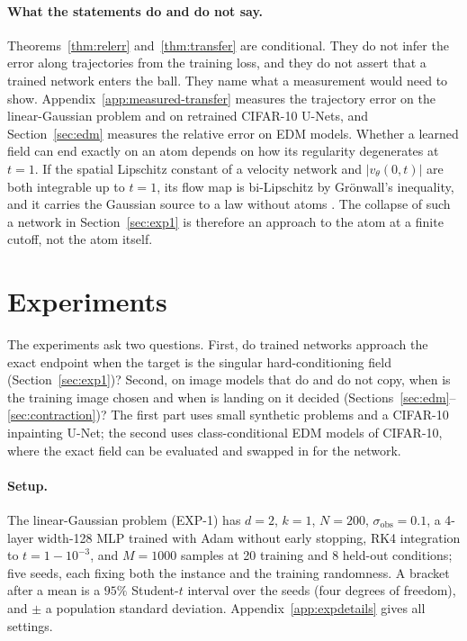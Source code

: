 \documentclass{article} %
\theoremstyle{plain}
\theoremstyle{definition}
\theoremstyle{remark}
\begin{document}
\paragraph{What the statements do and do not say.} Theorems~\ref{thm:relerr}
and~\ref{thm:transfer} are conditional. They do not infer
the error along trajectories from the training loss, and they do not assert that a trained network
enters the ball. They name what a measurement would need to show.
Appendix~\ref{app:measured-transfer} measures the trajectory error on the linear-Gaussian problem
and on retrained CIFAR-10 U-Nets, and Section~\ref{sec:edm} measures the relative error on EDM
models. Whether a learned field can end exactly on an atom depends on how its regularity degenerates
at $t=1$. If the spatial Lipschitz constant of a velocity network and $|v_\theta(0,t)|$ are both
integrable up to $t=1$, its flow map is bi-Lipschitz by Gr\"onwall's inequality, and it carries the
Gaussian source to a law without atoms \citep{companionA}. The collapse of such a network in
Section~\ref{sec:exp1} is therefore an approach to the atom at a finite cutoff, not the atom
itself.

\section{Experiments}
\label{sec:experiments}

The experiments ask two questions. First, do trained networks approach the exact endpoint when the
target is the singular hard-conditioning field (Section~\ref{sec:exp1})? Second, on image models
that do and do not copy, when is the training image chosen and when is landing on it decided
(Sections~\ref{sec:edm}--\ref{sec:contraction})? The first part uses small synthetic problems and a
CIFAR-10 inpainting U-Net; the second uses class-conditional EDM models of CIFAR-10, where the
exact field can be evaluated and swapped in for the network.

\paragraph{Setup.} The linear-Gaussian problem (EXP-1) has $d{=}2$, $k{=}1$, $N{=}200$,
$\sigma_{\mathrm{obs}}{=}0.1$, a 4-layer width-128 MLP trained with Adam without early stopping,
RK4 integration to $t{=}1{-}10^{-3}$, and $M{=}1000$ samples at 20 training and 8 held-out
conditions; five seeds, each fixing both the instance and the training randomness. A bracket
after a mean is a $95\%$ Student-$t$ interval over the seeds (four degrees of freedom), and $\pm$
a population standard deviation. Appendix~\ref{app:expdetails} gives all settings.
\end{document}
